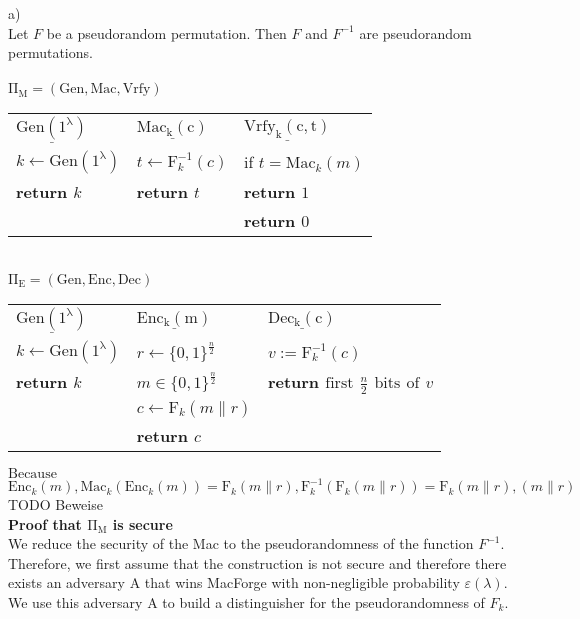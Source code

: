 \pagebreak
a)\\
Let $F$ be a pseudorandom permutation. Then $F$ and $F^{-1}$ are pseudorandom permutations.\\
\\
$\mathrm{\Pi_{M} = (Gen, Mac, Vrfy)}$\\
\vskip 0.05in
\begin{tabular}{l@{\hskip 1in}l@{\hskip 0.5in}l}
$\underline{\mathrm{Gen(1^{\lambda })}}$ & $\underline{\mathrm{Mac_{k}(c)}}$ & $\underline{\mathrm{Vrfy_{k}(c,t)}}$ \\
$k \leftarrow \mathrm{Gen(1^{\lambda})}$ & $t \leftarrow \mathrm{F}_{k}^{-1}(c)$ & if $t = \mathrm{Mac}_{k}(m)$\\
\bf{return} $k$ & \bf{return} $t$ & \indent\bf{return} $1$\\
 & & \bf{return} $0$\\
\end{tabular}\\
\vskip 1cm
\noindent$\mathrm{\Pi_{E} = (Gen, Enc, Dec)}$\\
\vskip 0.05in
\begin{tabular}{l@{\hskip 1in}l@{\hskip 0.5in}l}
$\underline{\mathrm{Gen(1^{\lambda })}}$ & $\underline{\mathrm{Enc_{k}(m)}}$ & $\underline{\mathrm{Dec_{k}(c)}}$ \\
$k \leftarrow \mathrm{Gen(1^{\lambda})}$ & $r \leftarrow \{0,1\}^{\frac{n}{2}}$ & $v := \mathrm{F}_{k}^{-1}(c)$\\
\bf{return} $k$ & $m \in  \{0,1\}^{\frac{n}{2}}$ & \bf{return} $\mathrm{first}$ $\frac{n}{2}$ $\mathrm{bits}$ $\mathrm{of}$  $v$  \\
 & $c \leftarrow \mathrm{F}_{k}(m \parallel r)$ &  \\
 & \bf{return} $c$ & \\
\end{tabular}
\vskip 1cm
\noindent $\mathrm{Because}$ $\mathrm{Enc}_{k}(m), \mathrm{Mac}_{k}(\mathrm{Enc}_{k}(m)) = \mathrm{F}_{k}(m\parallel r), \mathrm{F}_{k}^{-1}(\mathrm{F}_{k}(m\parallel r)) = \mathrm{F}_{k}(m\parallel r), (m\parallel r)$\\
\vskip 1cm
\noindent TODO Beweise\\
\textbf{Proof that $\mathrm{\Pi_{M}}$ is secure}\\
We reduce the security of the Mac to the pseudorandomness of the function $F^{-1}$.\\
Therefore, we first assume that the construction is not secure and therefore there exists an adversary A that wins MacForge with non-negligible probability $\varepsilon(\lambda )$. We use this adversary A to build a distinguisher for the pseudorandomness of $F_{k}$.\\
